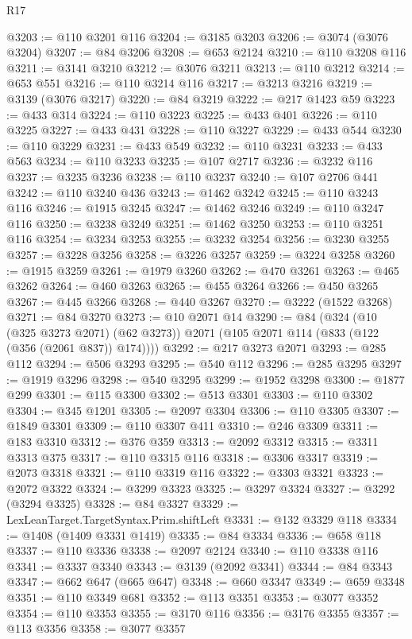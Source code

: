 \begin{lexlean}{R17}
\begin{coremodule}
{{{{{{{{{{{{{{{{{{{{{{{{{{{{{{{{{{{{{{{{{{{{{{{{{{{{{{{{{{{{{{{{{{{{{{{{{{{{{{{{{{{{{@3203 := @110 @3201 @116
@3204 := @3185 @3203
@3206 := @3074 (@3076 @3204)
@3207 := @84 @3206
@3208 := @653 @2124
@3210 := @110 @3208 @116
@3211 := @3141 @3210
@3212 := @3076 @3211
@3213 := @110 @3212
@3214 := @653 @551
@3216 := @110 @3214 @116
@3217 := @3213 @3216
@3219 := @3139 (@3076 @3217)
@3220 := @84 @3219
@3222 := @217 @1423 @59
@3223 := @433 @314
@3224 := @110 @3223
@3225 := @433 @401
@3226 := @110 @3225
@3227 := @433 @431
@3228 := @110 @3227
@3229 := @433 @544
@3230 := @110 @3229
@3231 := @433 @549
@3232 := @110 @3231
@3233 := @433 @563
@3234 := @110 @3233
@3235 := @107 @2717
@3236 := @3232 @116
@3237 := @3235 @3236
@3238 := @110 @3237
@3240 := @107 @2706 @441
@3242 := @110 @3240 @436
@3243 := @1462 @3242
@3245 := @110 @3243 @116
@3246 := @1915 @3245
@3247 := @1462 @3246
@3249 := @110 @3247 @116
@3250 := @3238 @3249
@3251 := @1462 @3250
@3253 := @110 @3251 @116
@3254 := @3234 @3253
@3255 := @3232 @3254
@3256 := @3230 @3255
@3257 := @3228 @3256
@3258 := @3226 @3257
@3259 := @3224 @3258
@3260 := @1915 @3259
@3261 := @1979 @3260
@3262 := @470 @3261
@3263 := @465 @3262
@3264 := @460 @3263
@3265 := @455 @3264
@3266 := @450 @3265
@3267 := @445 @3266
@3268 := @440 @3267
@3270 := @3222 (@1522 @3268)
@3271 := @84 @3270
@3273 := @10 @2071 @14
@3290 := @84
    (@324
      (@10 (@325 @3273 @2071) (@62 @3273))
      @2071
      (@105 @2071 @114 (@833 (@122 (@356 (@2061 @837)) @174))))
@3292 := @217 @3273 @2071
@3293 := @285 @112
@3294 := @506 @3293
@3295 := @540 @112
@3296 := @285 @3295
@3297 := @1919 @3296
@3298 := @540 @3295
@3299 := @1952 @3298
@3300 := @1877 @299
@3301 := @115 @3300
@3302 := @513 @3301
@3303 := @110 @3302
@3304 := @345 @1201
@3305 := @2097 @3304
@3306 := @110 @3305
@3307 := @1849 @3301
@3309 := @110 @3307 @411
@3310 := @246 @3309
@3311 := @183 @3310
@3312 := @376 @359
@3313 := @2092 @3312
@3315 := @3311 @3313 @375
@3317 := @110 @3315 @116
@3318 := @3306 @3317
@3319 := @2073 @3318
@3321 := @110 @3319 @116
@3322 := @3303 @3321
@3323 := @2072 @3322
@3324 := @3299 @3323
@3325 := @3297 @3324
@3327 := @3292 (@3294 @3325)
@3328 := @84 @3327
@3329 := LexLeanTarget.TargetSyntax.Prim.shiftLeft
@3331 := @132 @3329 @118
@3334 := @1408 (@1409 @3331 @1419)
@3335 := @84 @3334
@3336 := @658 @118
@3337 := @110 @3336
@3338 := @2097 @2124
@3340 := @110 @3338 @116
@3341 := @3337 @3340
@3343 := @3139 (@2092 @3341)
@3344 := @84 @3343
@3347 := @662 @647 (@665 @647)
@3348 := @660 @3347
@3349 := @659 @3348
@3351 := @110 @3349 @681
@3352 := @113 @3351
@3353 := @3077 @3352
@3354 := @110 @3353
@3355 := @3170 @116
@3356 := @3176 @3355
@3357 := @113 @3356
@3358 := @3077 @3357
}}}}}}}}}}}}}}}}}}}}}}}}}}}}}}}}}}}}}}}}}}}}}}}}}}}}}}}}}}}}}}}}}}}}}}}}}}}}}}}}}}}}}
\end{coremodule}
\end{lexlean}
